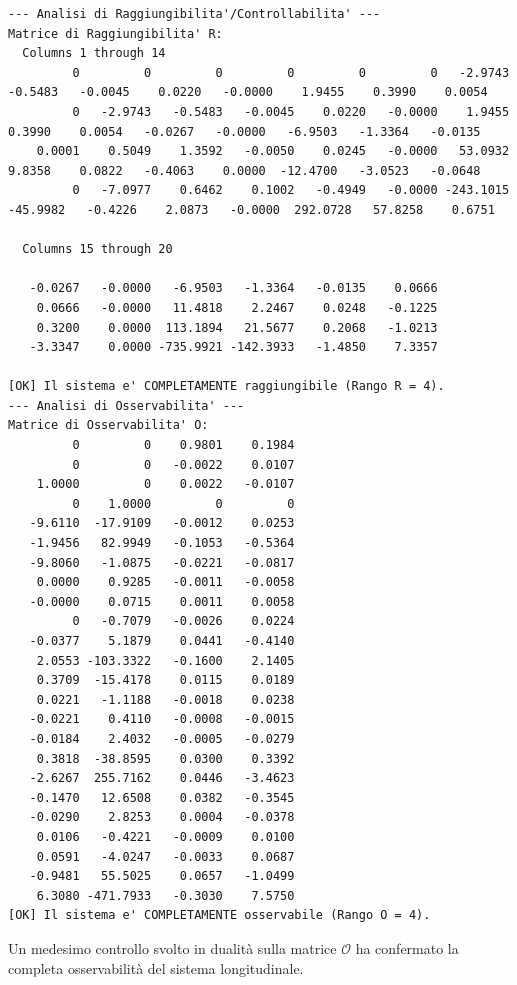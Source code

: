 \begin{lstlisting}[basicstyle=\ttfamily\scriptsize, breaklines=true, backgroundcolor=\color{lightgray!10}, frame=single, title={Risultato del calcolo delle Matrici di Raggiungibilita' e Osservabilita'}]
--- Analisi di Raggiungibilita'/Controllabilita' ---
Matrice di Raggiungibilita' R:
  Columns 1 through 14
         0         0         0         0         0         0   -2.9743   -0.5483   -0.0045    0.0220   -0.0000    1.9455    0.3990    0.0054
         0   -2.9743   -0.5483   -0.0045    0.0220   -0.0000    1.9455    0.3990    0.0054   -0.0267   -0.0000   -6.9503   -1.3364   -0.0135
    0.0001    0.5049    1.3592   -0.0050    0.0245   -0.0000   53.0932    9.8358    0.0822   -0.4063    0.0000  -12.4700   -3.0523   -0.0648
         0   -7.0977    0.6462    0.1002   -0.4949   -0.0000 -243.1015  -45.9982   -0.4226    2.0873   -0.0000  292.0728   57.8258    0.6751

  Columns 15 through 20

   -0.0267   -0.0000   -6.9503   -1.3364   -0.0135    0.0666
    0.0666   -0.0000   11.4818    2.2467    0.0248   -0.1225
    0.3200    0.0000  113.1894   21.5677    0.2068   -1.0213
   -3.3347    0.0000 -735.9921 -142.3933   -1.4850    7.3357

[OK] Il sistema e' COMPLETAMENTE raggiungibile (Rango R = 4).
--- Analisi di Osservabilita' ---
Matrice di Osservabilita' O:
         0         0    0.9801    0.1984
         0         0   -0.0022    0.0107
    1.0000         0    0.0022   -0.0107
         0    1.0000         0         0
   -9.6110  -17.9109   -0.0012    0.0253
   -1.9456   82.9949   -0.1053   -0.5364
   -9.8060   -1.0875   -0.0221   -0.0817
    0.0000    0.9285   -0.0011   -0.0058
   -0.0000    0.0715    0.0011    0.0058
         0   -0.7079   -0.0026    0.0224
   -0.0377    5.1879    0.0441   -0.4140
    2.0553 -103.3322   -0.1600    2.1405
    0.3709  -15.4178    0.0115    0.0189
    0.0221   -1.1188   -0.0018    0.0238
   -0.0221    0.4110   -0.0008   -0.0015
   -0.0184    2.4032   -0.0005   -0.0279
    0.3818  -38.8595    0.0300    0.3392
   -2.6267  255.7162    0.0446   -3.4623
   -0.1470   12.6508    0.0382   -0.3545
   -0.0290    2.8253    0.0004   -0.0378
    0.0106   -0.4221   -0.0009    0.0100
    0.0591   -4.0247   -0.0033    0.0687
   -0.9481   55.5025    0.0657   -1.0499
    6.3080 -471.7933   -0.3030    7.5750
[OK] Il sistema e' COMPLETAMENTE osservabile (Rango O = 4).
\end{lstlisting}

Un medesimo controllo svolto in dualità sulla matrice $\mathcal{O}$ ha confermato la completa osservabilità del sistema longitudinale.

